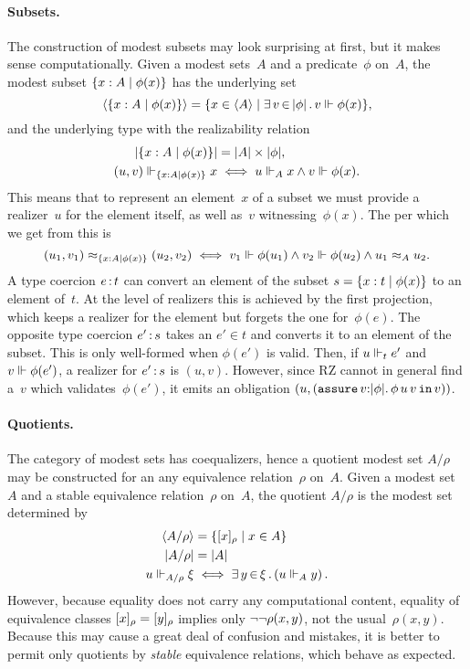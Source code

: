 \paragraph{Subsets.}
%
\iflong
The construction of modest subsets may look surprising at first, but
it makes sense computationally.
\fi %
Given a modest sets~$A$ and a
predicate~$\phi$ on~$A$, the modest subset $\{x : A \mid \phi(x)\}$
has the underlying set
%
\begin{equation*}
  \langle \{x : A \mid \phi(x)\} \rangle =
  \{x \in \langle A \rangle \mid \exists\, v \,{\in}\, |\phi|\,.\,v \Vdash \phi(x)\},
\end{equation*}
%
and the underlying type with the realizability relation
%
\begin{align*}
  |\{x : A \mid \phi(x)\}| &= |A| \times
  |\phi|,\\
  (u,v) \Vdash_{\{x : A \mid \phi(x)\}} x &\iff
  u \Vdash_A x \land v \Vdash \phi(x).
\end{align*}
%
This means that to represent an element~$x$ of a subset we must
provide a realizer~$u$ for the element itself, as well as~$v$
witnessing~$\phi(x)$. The per which we get from this is
%
\begin{equation*}
  (u_1, v_1) \approx_{\{x : A \mid \phi(x)\}} (u_2, v_2) \iff
  v_1 \Vdash \phi(u_1) \land v_2 \Vdash \phi(u_2) \land
  u_1 \approx_A u_2.
\end{equation*}
%
A type coercion $e\,{:}\,t$ can convert an element of the subset $s =
\{x : t \mid \phi(x)\}$ to an element of~$t$. At the level of
realizers this is achieved by the first projection, which keeps a
realizer for the element but forgets the one for~$\phi(e)$. The
opposite type coercion $e'\,{:}\,s$ takes an $e' \in t$ and converts it
to an element of the subset. This is only well-formed when $\phi(e')$
is valid. Then, if $u \Vdash_t e'$ and $v \Vdash \phi(e')$, a realizer for
$e'\,{:}\,s$ is $(u, v)$. However, since RZ cannot in general find
a~$v$ which validates~$\phi(e')$, it emits an obligation $(u,
(\mathtt{assure}\,v{:}|\phi|.\,\phi\,u\,v\,\mathtt{in}\,v))$.

\paragraph{Quotients.}
%
The category of modest sets has coequalizers, hence a quotient modest
set $A/\rho$ may be constructed for an any equivalence relation~$\rho$
on~$A$. 
%
Given a modest set~$A$ and a stable equivalence relation~$\rho$
on~$A$, the quotient $A/\rho$ is the modest set determined by
\begin{align*}
  \langle A/\rho \rangle &= \{[x]_{\rho} \mid x \in A\} \\
  |A/\rho| &= |A| \\
  u \Vdash_{A/\rho} \xi &\iff \exists\, y \,{\in}\, \xi\,.\left(u \Vdash_A y\right).
\end{align*}
%
However, because equality does not carry any computational
content, equality of equivalence classes $[x]_{\rho} =
[y]_{\rho}$ implies only $\lnot \lnot \rho(x,y)$, not the
usual~$\rho(x,y)$. Because this may cause a great deal of confusion
and mistakes, it is better to permit only quotients by \emph{stable}
equivalence relations, which behave as expected.
%

